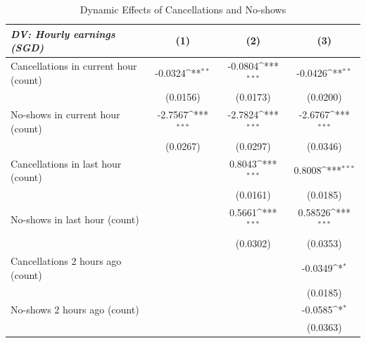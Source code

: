 \documentclass[reviewmode]{restat}
\begin{document}
	\begin{table}[]
		\caption{Dynamic Effects of Cancellations and No-shows}
		\label{tb:hourlyreg}
			\footnotesize
			\setlength{\tabcolsep}{0pt}
			{
            \def\sym#1{\ifmmode^{#1}\else\(^{#1}\)\fi}
			\begin{tabularx}{\textwidth}{l@{\extracolsep{\fill}}*{3}{c}}
			\toprule
			\toprule
			 \multicolumn{1}{l}{\textit{DV: Hourly earnings (SGD)}}&\multicolumn{1}{c}{(1)}         &\multicolumn{1}{c}{(2)}         &\multicolumn{1}{c}{(3)}                  \\
			\midrule
			Cancellations in current hour (count)&     -0.0324\sym{**} &     -0.0804\sym{***}&     -0.0426\sym{**}\\
			                    &    (0.0156)         &    (0.0173)         &    (0.0200)        \\
			\addlinespace
			No-shows in current hour (count)&     -2.7567\sym{***}&     -2.7824\sym{***}&     -2.6767\sym{***} \\
			                    &    (0.0267)         &    (0.0297)         &    (0.0346) \\
			\addlinespace
			Cancellations in last hour (count)&                     &      0.8043\sym{***}&      0.8008\sym{***} \\
			                    &                     &    (0.0161)         &    (0.0185) \\
			\addlinespace
			No-shows in last hour (count)&                     &      0.5661\sym{***}&      0.58526\sym{***} \\
			                    &                     &    (0.0302)         &    (0.0353) \\
			\addlinespace
			Cancellations 2 hours ago (count)&                     &                     &     -0.0349\sym{*} \\
			                    &                     &                     &    (0.0185) \\
			\addlinespace
			No-shows 2 hours ago (count)&                     &                     &     -0.0585\sym{*} \\
			                    &                     &                     &    (0.0363) \\

\end{tabularx}}
\end{table}
\end{document}
